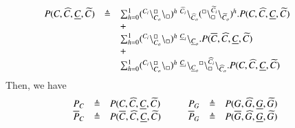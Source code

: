 \[
\begin{array}{lcl @{\hspace{1cm}}lcl}
P(C,\widehat{C},\underline{C},\widetilde{C}) & \defeq &  \sum_{h=0}^1 (\startchain{C_i}\chainedlink{C_o}{\noact}\chainend{\noact})^h\ \link{\widehat{C}_i}{\widehat{C}_o} (\startchain{\noact}\chainedlink{\noact}{\widetilde{C}_i}\chainend{\widetilde{C}_o})^h.   P(C,\widehat{C},\underline{C},\widetilde{C})\\
&&+\\
&& \sum_{h=0}^1 (\startchain{C_i}\chainedlink{C_o}{\noact}\chainend{\noact})^h\ \link{\underline{C}_i}{\underline{C}_o}.P(\overline{C},\widehat{C},\underline{C},\widetilde{C})\\
&&+\\
 && \sum_{h=0}^1 (\startchain{C_i}\chainedlink{C_o}{\noact}\chainend{\noact})^h\ \link{\underline{C}_i}{\underline{C}_o} \startchain{\noact}\chainedlink{\noact}{\widehat{C}_i}\chainend{\widehat{C}_o}.   P(C,\widehat{C},\underline{C},\widetilde{C}) \\
\end{array}
\]
Then, we have
\[
\begin{array}{lcl @{\hspace{1cm}}lcl@{\hspace{0.4cm}}lcl@{\hspace{0.4cm}}lcl}
P_C & \defeq &  P(C,\widehat{C},\underline{C},\widetilde{C})&  P_G& \defeq &   P(G,\widehat{G},\underline{G},\widetilde{G}) \\
\overline{P}_C & \defeq &  P(\overline{C},\widehat{C},\underline{C},\widetilde{C}) & 
\overline{P}_G& \defeq &   P(\overline{G},\widehat{G},\underline{G},\widetilde{G})\\
\end{array}
\]

